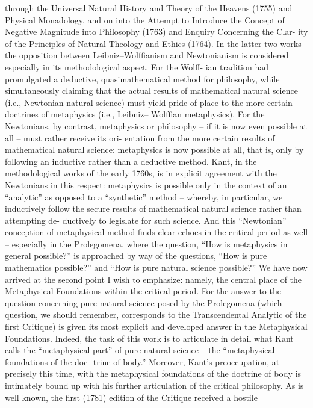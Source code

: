 through the Universal Natural History and Theory of the Heavens (1755)
and Physical Monadology, and on into the Attempt to Introduce the Concept of
Negative Magnitude into Philosophy (1763) and Enquiry Concerning the Clar-
ity of the Principles of Natural Theology and Ethics (1764). In the latter two
works the opposition between Leibniz–Wolfﬁanism and Newtonianism
is considered especially in its methodological aspect. For the Wolff-
ian tradition had promulgated a deductive, quasimathematical method
for philosophy, while simultaneously claiming that the actual results of
mathematical natural science (i.e., Newtonian natural science) must yield
pride of place to the more certain doctrines of metaphysics (i.e., Leibniz–
Wolfﬁan metaphysics). For the Newtonians, by contrast, metaphysics or
philosophy – if it is now even possible at all – must rather receive its ori-
entation from the more certain results of mathematical natural science:
metaphysics is now possible at all, that is, only by following an inductive
rather than a deductive method. Kant, in the methodological works of the
early 1760s, is in explicit agreement with the Newtonians in this respect:
metaphysics is possible only in the context of an “analytic” as opposed to
a “synthetic” method – whereby, in particular, we inductively follow the
secure results of mathematical natural science rather than attempting de-
ductively to legislate for such science. And this “Newtonian” conception
of metaphysical method ﬁnds clear echoes in the critical period as well –
especially in the Prolegomena, where the question, “How is metaphysics
in general possible?” is approached by way of the questions, “How is pure
mathematics possible?” and “How is pure natural science possible?”
We have now arrived at the second point I wish to emphasize: namely,
the central place of the Metaphysical Foundations within the critical period.
For the answer to the question concerning pure natural science posed by
the Prolegomena (which question, we should remember, corresponds to
the Transcendental Analytic of the ﬁrst Critique) is given its most explicit
and developed answer in the Metaphysical Foundations. Indeed, the task
of this work is to articulate in detail what Kant calls the “metaphysical
part” of pure natural science – the “metaphysical foundations of the doc-
trine of body.” Moreover, Kant’s preoccupation, at precisely this time,
with the metaphysical foundations of the doctrine of body is intimately
bound up with his further articulation of the critical philosophy. As is
well known, the ﬁrst (1781) edition of the Critique received a hostile
